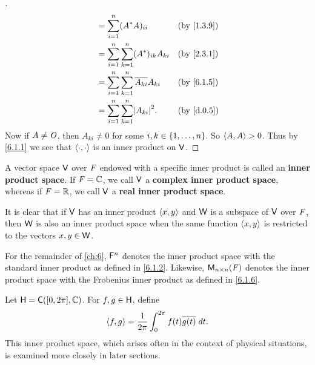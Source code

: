 \begin{proof}[]
\begin{align*}
		           & = \sum_{i = 1}^n (A^* A)_{i i}                         &  & \by{1.3.9} \\
		           & = \sum_{i = 1}^n \sum_{k = 1}^n (A^*)_{i k} A_{k i}    &  & \by{2.3.1} \\
		           & = \sum_{i = 1}^n \sum_{k = 1}^n \conj{A_{k i}} A_{k i} &  & \by{6.1.5} \\
		           & = \sum_{i = 1}^n \sum_{k = 1}^n \abs{A_{k i}}^2.       &  & \by{d.0.5}
	\end{align*}
	Now if \(A \neq \mathit{O}\), then \(A_{k i} \neq 0\) for some \(i, k \in \left\lbrace1, \dots, n\right\rbrace\).
	So \(\left\langle A, A\right\rangle > 0\).
	Thus by \cref{6.1.1} we see that \(\left\langle\cdot, \cdot\right\rangle\) is an inner product on \(\mathsf{V}\).
\end{proof}

\begin{defn}\label{6.1.7}
	A vector space \(\mathsf{V}\) over \(\mathit{F}\) endowed with a specific inner product is called an \textbf{inner product space}.
	If \(\mathit{F} = \mathbb{C}\), we call \(\mathsf{V}\) a \textbf{complex inner product space}, whereas if \(\mathit{F} = \mathbb{R}\), we call \(\mathsf{V}\) a \textbf{real inner product space}.

	It is clear that if \(\mathsf{V}\) has an inner product \(\left\langle x, y\right\rangle\) and \(\mathsf{W}\) is a subspace of \(\mathsf{V}\) over \(\mathit{F}\), then \(\mathsf{W}\) is also an inner product space when the same function \(\left\langle x, y\right\rangle\) is restricted to the vectors \(x, y \in \mathsf{W}\).
\end{defn}

\begin{note}
	For the remainder of \cref{ch:6}, \(\mathsf{F}^n\) denotes the inner product space with the standard inner product as defined in \cref{6.1.2}.
	Likewise, \(\ms[n][n][\F]\) denotes the inner product space with the Frobenius inner product as defined in \cref{6.1.6}.
\end{note}

\begin{eg}\label{6.1.8}
	Let \(\vs{H} = \cfs([0, 2 \pi], \C)\).
	For \(f, g \in \mathsf{H}\), define
	\[
		\left\langle f, g\right\rangle = \frac{1}{2 \pi} \int_0^{2 \pi} f(t) \overline{g(t)} \; dt.
	\]
	This inner product space, which arises often in the context of physical situations, is examined more closely in later sections.
\end{eg}

